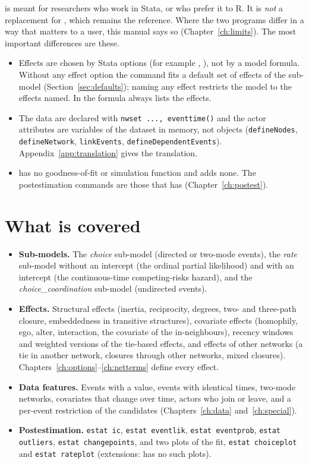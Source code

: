 \nwdynam{} is meant for researchers who work in Stata, or who prefer it to R. It is \emph{not} a replacement for \goldfish{}, which remains the reference. Where the two programs differ in a way that matters to a user, this manual says so (Chapter~\ref{ch:limits}). The most important differences are these.
\begin{itemize}[nosep]
  \item Effects are chosen by Stata options (for example , ), not by a model formula. Without any effect option the command fits a default set of effects of the sub-model (Section~\ref{sec:defaults}); naming any effect restricts the model to the effects named. In \goldfish{} the formula always lists the effects.
  \item The data are declared with \texttt{nwset ..., eventtime()} and the actor attributes are variables of the dataset in memory, not \goldfish{} objects (\texttt{defineNodes}, \texttt{defineNetwork}, \texttt{linkEvents}, \texttt{defineDependentEvents}). Appendix~\ref{app:translation} gives the translation.
  \item \goldfish{} has no goodness-of-fit or simulation function and \nwdynam{} adds none. The postestimation commands are those that \goldfish{} has (Chapter~\ref{ch:postest}).
\end{itemize}

\section{What is covered}

\begin{itemize}[nosep]
  \item \textbf{Sub-models.} The \emph{choice} sub-model (directed or two-mode events), the \emph{rate} sub-model without an intercept (the ordinal partial likelihood) and with an intercept (the continuous-time competing-risks hazard), and the \emph{choice\_coordination} sub-model (undirected events).
  \item \textbf{Effects.} Structural effects (inertia, reciprocity, degrees, two- and three-path closure, embeddedness in transitive structures), covariate effects (homophily, ego, alter, interaction, the covariate of the in-neighbours), recency windows and weighted versions of the tie-based effects, and effects of other networks (a tie in another network, closures through other networks, mixed closures). Chapters~\ref{ch:options}--\ref{ch:netterms} define every effect.
  \item \textbf{Data features.} Events with a value, events with identical times, two-mode networks, covariates that change over time, actors who join or leave, and a per-event restriction of the candidates (Chapters~\ref{ch:data} and~\ref{ch:special}).
  \item \textbf{Postestimation.} \texttt{estat ic}, \texttt{estat eventlik}, \texttt{estat eventprob}, \texttt{estat outliers}, \texttt{estat changepoints}, and two plots of the fit, \texttt{estat choiceplot} and \texttt{estat rateplot} (extensions: \goldfish{} has no such plots).
\end{itemize}

